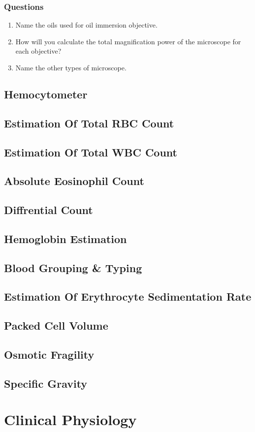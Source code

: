 \documentclass{book}
\begin{document}
\section{Questions}
\begin{enumerate}
\item Name the oils used for oil immersion objective.
\item How will you calculate the total magnification power of the microscope for each objective?
\item Name the other types of microscope.
\end{enumerate}

\chapter{Hemocytometer}
\chapter{Estimation Of Total RBC Count}
\chapter{Estimation Of Total WBC Count}
\chapter{Absolute Eosinophil Count}
\chapter{Diffrential Count}
\chapter{Hemoglobin Estimation}
\chapter{Blood Grouping \& Typing}
\chapter{Estimation Of Erythrocyte Sedimentation Rate}
\chapter{Packed Cell Volume}
\chapter{Osmotic Fragility}
\chapter{Specific Gravity}

\part{Clinical Physiology}
\end{document}

